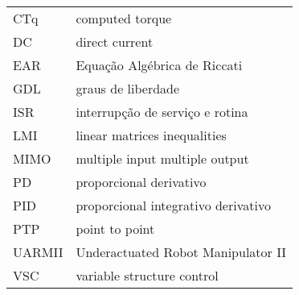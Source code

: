 \begin{longtable}{ll}
CTq & computed torque \\
DC & direct current \\
EAR & Equação Algébrica de Riccati \\
GDL & graus de liberdade \\
ISR & interrupção de serviço e rotina \\
LMI & linear matrices inequalities \\
MIMO & multiple input multiple output \\
PD & proporcional derivativo \\
PID & proporcional integrativo derivativo \\
PTP & point to point \\
UARMII & Underactuated Robot Manipulator II \\
VSC & variable structure control \\

\end{longtable}

